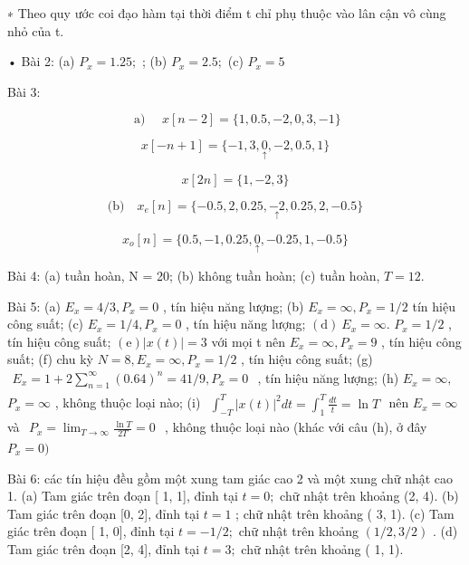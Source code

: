 \documentclass[
  10
]{article}
\begin{document}
∗ Theo quy ước coi đạo hàm tại thời điểm t chỉ phụ thuộc vào lân cận vô
cùng nhỏ của t.

• Bài 2: (a) \(P _ { x } = 1 . 2 5 ;\) ; (b) \(P _ { x } = 2 . 5 ;\) (c)
\(P _ { x } = 5\)

Bài 3:

\[
\text { a) } \quad x [ n - 2 ] = \{1, 0. 5, - 2, 0, 3, - 1 \}
\]

\[
x [ - n + 1 ] = \{- 1, 3, \underset {\uparrow} {0}, - 2, 0. 5, 1 \}
\]

\[
x [ 2 n ] = \{1, - 2, 3 \}
\]

\[
\text {(b)} \quad x _ {e} [ n ] = \{- 0. 5, 2, 0. 2 5, \underset {\uparrow} {- 2}, 0. 2 5, 2, - 0. 5 \}
\]

\[
x _ {o} [ n ] = \{0. 5, - 1, 0. 2 5, \underset {\uparrow} {0}, - 0. 2 5, 1, - 0. 5 \}
\]

Bài 4: (a) tuần hoàn, N = 20; (b) không tuần hoàn; (c) tuần hoàn,
\(T = 1 2 .\)

Bài 5: (a) \(E _ { x } = 4 / 3 , P _ { x } = 0\) , tín hiệu năng lượng;
(b) \(E _ { x } = \infty , P _ { x } = 1 / 2\) tín hiệu công suất; (c)
\(E _ { x } = 1 / 4 , P _ { x } = 0\) , tín hiệu năng lượng;
\(\mathrm { ( d ) } \ E _ { x } = \infty .\) \(P _ { x } = 1 / 2\) , tín
hiệu công suất; \(( \mathrm { e } ) | x ( t ) | = 3\) với mọi t nên
\(E _ { x } = \infty , P _ { x } = 9\) , tín hiệu công suất; (f) chu kỳ
\(N = 8 , E _ { x } = \infty , P _ { x } = 1 / 2\) , tín hiệu công suất;
(g)
\(\begin{array} { r } { E _ { x } = 1 + 2 \sum _ { n = 1 } ^ { \infty } ( 0 . 6 4 ) ^ { n } = 4 1 / 9 , P _ { x } = 0 } \end{array}\)
, tín hiệu năng lượng; (h) \(E _ { x } = \infty ,\)
\(P _ { x } = \infty\) , không thuộc loại nào; (i)
\(\begin{array} { r } { \int _ { - T } ^ { T } | x ( t ) | ^ { 2 } d t = \int _ { 1 } ^ { T } \frac { d t } { t } = \ln T } \end{array}\)
nên \(E _ { x } = \infty\) và
\(\begin{array} { r } { P _ { x } = \operatorname* { l i m } _ { T \to \infty } \frac { \ln T } { 2 T } = 0 } \end{array}\)
, không thuộc loại nào (khác với câu (h), ở đây \(P _ { x } = 0 )\)

Bài 6: các tín hiệu đều gồm một xung tam giác cao 2 và một xung chữ nhật
cao 1. (a) Tam giác trên đoạn {[} 1, 1{]}, đỉnh tại \(t = 0 ;\) chữ nhật
trên khoảng (2, 4). (b) Tam giác trên đoạn {[}0, 2{]}, đỉnh tại
\(t = 1\) ; chữ nhật trên khoảng ( 3, 1). (c) Tam giác trên đoạn {[} 1,
0{]}, đỉnh tại \(t = - 1 / 2 ;\) chữ nhật trên khoảng
\(( 1 / 2 , 3 / 2 )\) . (d) Tam giác trên đoạn {[}2, 4{]}, đỉnh tại
\(t = 3 ;\) chữ nhật trên khoảng ( 1, 1).
\end{document}
